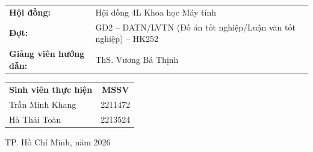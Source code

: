 \begin{titlepage}
\vspace{0.45cm}

\begin{center}
\fontsize{12}{14}\selectfont
\renewcommand{\arraystretch}{1.2}

\begin{tabular}{@{}L{3.2cm}L{10.5cm}@{}}
    \textbf{Hội đồng:} & Hội đồng 4L Khoa học Máy tính \\
    \textbf{Đợt:} & GD2 -- DATN/LVTN (Đồ án tốt nghiệp/Luận văn tốt nghiệp) -- HK252 \\
    \textbf{Giảng viên hướng dẫn:} & ThS. Vương Bá Thịnh \\
\end{tabular}


\vspace{0.25cm}

\begin{tabular}{@{}l c@{}}
    \textbf{Sinh viên thực hiện} & \textbf{MSSV} \\[0.15cm]
    Trần Minh Khang   & 2211472 \\
    Hà Thái Toàn      & 2213524 \\
\end{tabular}

\vspace{0.25cm}

\end{center}

\vspace{0.2cm}

\begin{center}
    \fontsize{13}{15}\selectfont TP. Hồ Chí Minh, năm 2026
\end{center}

\end{titlepage}
